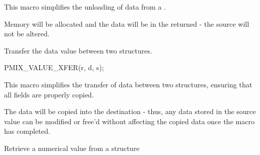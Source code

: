 \begin{arglist}
\end{arglist}

\descr

This macro simplifies the unloading of data from a .

\adviceuserstart
Memory will be allocated and the data will be in the  returned - the source  will not be altered.
\adviceuserend



\summary

Transfer the data value between two  structures.

\cspecificstart
\begin{codepar}
PMIX_VALUE_XFER(r, d, s);
\end{codepar}
\cspecificend

\begin{arglist}
\end{arglist}

\descr

This macro simplifies the transfer of data between two  structures, ensuring that all fields are properly copied.

\adviceuserstart
The data will be copied into the destination  - thus, any data stored in the source value can be modified or free'd without affecting the copied data once the macro has completed.
\adviceuserend



Retrieve a numerical value from a  structure

